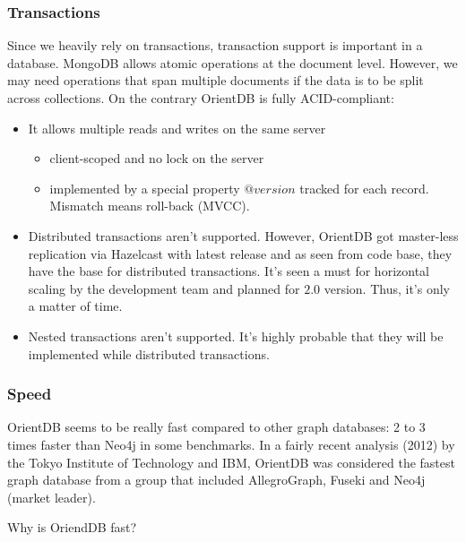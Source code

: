 \subsubsection*{Transactions}

Since we heavily rely on transactions, transaction support is important in a database. MongoDB allows atomic operations at the document level. However, we may need operations that span multiple documents if the data is to be split across collections. On the contrary OrientDB is fully ACID-compliant:
\begin{itemize}
  \item It allows multiple reads and writes on the same server
    \begin{itemize}
      \item client-scoped and no lock on the server
      \item implemented by a special property $@version$ tracked for each record. Mismatch means roll-back (MVCC).
    \end{itemize}
    \item Distributed transactions aren't supported. However, OrientDB got master-less replication via Hazelcast with latest release and as seen from code base, they have the base for distributed transactions. It's seen a must for horizontal scaling by the development team and planned for $2.0$ version. Thus, it's only a matter of time.
    \item Nested transactions aren't supported. It's highly probable that they will be implemented while distributed transactions.
\end{itemize}

\subsubsection*{Speed}

OrientDB seems to be really fast compared to other graph databases: 2 to 3 times faster than Neo4j in some benchmarks. In a fairly recent analysis (2012) by the Tokyo Institute of Technology and IBM, OrientDB was considered the fastest graph database from a group that included AllegroGraph, Fuseki and Neo4j (market leader).

Why is OriendDB fast?

